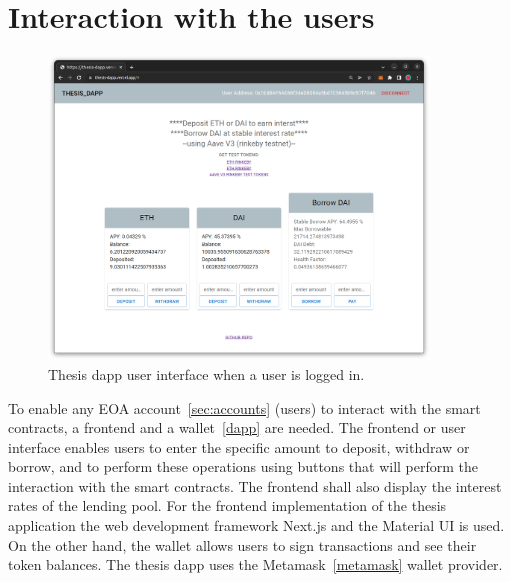 \documentclass[11pt,a4paper]{report}
\begin{document}
\section{Interaction with the users}
\begin{figure}
	\centering
	\includegraphics[width=0.90\textwidth]{./images/thesis-dapp}
	\caption{Thesis dapp user interface when a user is logged in.}
	\label{fig:tdapp}
\end{figure}
To enable any EOA account~\ref{sec:accounts} (users) to interact with the smart contracts, a frontend and a wallet~\ref{dapp} are needed. The frontend or user interface enables users to enter the specific amount to deposit, withdraw or borrow, and to perform these operations using buttons that will perform the interaction with the smart contracts. The frontend shall also display the interest rates of the lending pool. For the frontend implementation of the thesis application the web development framework Next.js\cite{nextjs} and the Material UI\cite{mui} is used. On the other hand, the wallet allows users to sign transactions and see their token balances. The thesis dapp uses the Metamask~\ref{metamask} wallet provider.
\end{document}
